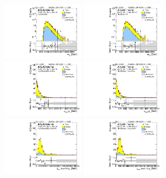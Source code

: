 \begin{figure}[htbp!]
\begin{center}
\includegraphics[width=0.31\textwidth,angle=-90]{figures/boosted/Prereweight/Moriond_FourTag_Sideband_mHH_l_1.pdf}
\includegraphics[width=0.31\textwidth,angle=-90]{figures/boosted/Sideband/b77_FourTag_Sideband_mHH_l_1.pdf}\\
\includegraphics[width=0.31\textwidth,angle=-90]{figures/boosted/Prereweight/Moriond_FourTag_Sideband_leadHCand_Pt_m.pdf}
\includegraphics[width=0.31\textwidth,angle=-90]{figures/boosted/Sideband/b77_FourTag_Sideband_leadHCand_Pt_m.pdf}\\
\includegraphics[width=0.31\textwidth,angle=-90]{figures/boosted/Prereweight/Moriond_FourTag_Sideband_leadHCand_trk0_Pt.pdf}
\includegraphics[width=0.31\textwidth,angle=-90]{figures/boosted/Sideband/b77_FourTag_Sideband_leadHCand_trk0_Pt.pdf}\\

\end{center}
\end{figure}
